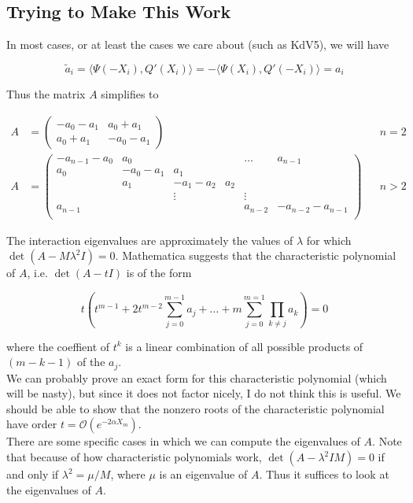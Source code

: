 \documentclass[12pt]{article}
\begin{document}
\subsection{Trying to Make This Work}

In most cases, or at least the cases we care about (such as KdV5), we will have

\[
\tilde{a}_i = \langle \Psi(-X_i), Q'(X_i) \rangle
= -\langle \Psi(X_i), Q'(-X_i) \rangle = a_i
\]

Thus the matrix $A$ simplifies to

\begin{align*}
A &= \begin{pmatrix}
-a_0 -a_1 & a_0 + a_1 \\
a_0 + a_1 & -a_0 - a_1
\end{pmatrix} && n = 2 \\
A &= \begin{pmatrix}
-a_{n-1} - a_0 & a_0 & & & \dots & a_{n-1}\\
a_0 & -a_0 - a_1 &  a_1 \\
& a_1 & -a_1 - a_2 &  a_2 \\
& & \vdots & & \vdots \\
a_{n-1} & & & & a_{n-2} & -a_{n-2} - a_{n-1} \\
\end{pmatrix} && n > 2
\end{align*}

The interaction eigenvalues are approximately the values of $\lambda$ for which $\det(A - M \lambda^2 I) = 0$. Mathematica suggests that the characteristic polynomial of $A$, i.e. $\det(A - t I)$ is of the form

\[
t\left( t^{m-1} + 2 t^{m-2} \sum_{j=0}^{m-1} a_j
+ \dots + m \sum_{j=0}^{m=1} \prod_{k \neq j} a_k \right) = 0
\]

where the coeffient of $t^k$ is a linear combination of all possible products of $(m-k-1)$ of the $a_j$. \\

We can probably prove an exact form for this characteristic polynomial (which will be nasty), but since it does not factor nicely, I do not think this is useful. We should be able to show that the nonzero roots of the characteristic polynomial have order $t = \mathcal{O}(e^{-2 \alpha X_m})$. \\

There are some specific cases in which we can compute the eigenvalues of $A$. Note that because of how characteristic polynomials work, $\det( A - \lambda^2 I M ) = 0$ if and only if $\lambda^2 = \mu / M$, where $\mu$ is an eigenvalue of $A$. Thus it suffices to look at the eigenvalues of $A$.
\end{document}
